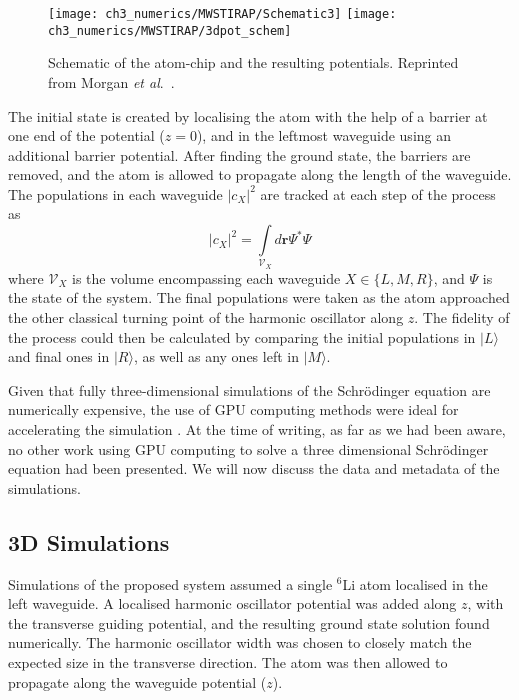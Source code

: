 \begin{figure}[tb]
    \centering
  \texttt{[image: ch3\_numerics/MWSTIRAP/Schematic3]}
  \texttt{[image: ch3\_numerics/MWSTIRAP/3dpot\_schem]}
  \caption{Schematic of the atom-chip and the resulting potentials. Reprinted from Morgan {\textit{et al}.}~\cite{AO:Morgan_pra_2013}.}
  \label{fig:schematic_atom-chip}
\end{figure}

The initial state is created by localising the atom with the help of a barrier at one end of the potential ($z=0$), and in the leftmost waveguide using an additional barrier potential. After finding the ground state, the barriers are removed, and the atom is allowed to propagate along the length of the waveguide. The populations in each waveguide $|c_{X}|^2$ are tracked at each step of the process as
\begin{equation}
    |c_X|^2 = \int\limits_{\mathcal{V}_X} d\mathbf{r}  \Psi^{*} \Psi
\end{equation}
where $\mathcal{V}_X$ is the volume encompassing each waveguide $X \in \{L,M,R\}$, and $\Psi$ is the state of the system.
The final populations were taken as the atom approached the other classical turning point of the harmonic oscillator along $z$. The fidelity of the process could then be calculated by comparing the initial populations in $| L \rangle$ and final ones in $|R \rangle$, as well as any ones left in $| M \rangle$.

Given that fully three-dimensional simulations of the Schr\"odinger equation are numerically expensive, the use of GPU computing methods were ideal for accelerating the simulation \cite{Num:Bauke_cpc_2011}. At the time of writing, as far as we had been aware, no other work using GPU computing to solve a three dimensional Schr\"odinger equation had been presented. We will now discuss the data and metadata of the simulations.

\subsection{3D Simulations}
\label{sec:Results}

Simulations of the proposed system assumed a single $^{6}$Li atom localised in the left \mbox{waveguide}. A localised harmonic oscillator potential was added along $z$, with the transverse guiding potential, and the resulting ground state solution found numerically. The harmonic oscillator width was chosen to closely match the expected size in the transverse direction. The atom was then allowed to propagate along the waveguide potential ($z$).

